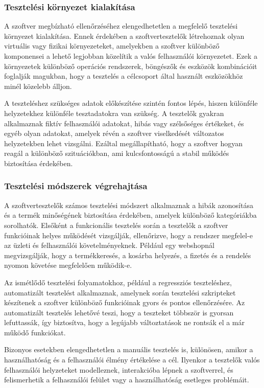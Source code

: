 \subsubsection{Tesztelési környezet kialakítása}
A szoftver megbízható ellenőrzéséhez elengedhetetlen a megfelelő tesztelési környezet kialakítása. Ennek érdekében a szoftvertesztelők létrehoznak olyan virtuális vagy fizikai környezeteket, amelyekben a szoftver különböző komponensei a lehető legjobban közelítik a valós felhasználói környezetet. Ezek a környezetek különböző operációs rendszerek, böngészők és eszközök kombinációit foglalják magukban, hogy a tesztelés a célcsoport által használt eszközökhöz minél közelebb álljon.  

A teszteléshez szükséges adatok előkészítése szintén fontos lépés, hiszen különféle helyzetekhez különféle tesztadatokra van szükség. A tesztelők gyakran alkalmaznak fiktív felhasználói adatokat, hibás vagy szélsőséges értékeket, és egyéb olyan adatokat, amelyek révén a szoftver viselkedését változatos helyzetekben lehet vizsgálni. Ezáltal megállapítható, hogy a szoftver hogyan reagál a különböző szituációkban, ami kulcsfontosságú a stabil működés biztosítása érdekében.

\subsubsection{Tesztelési módszerek végrehajtása}
A szoftvertesztelők számos tesztelési módszert alkalmaznak a hibák azonosítása és a termék minőségének biztosítása érdekében, amelyek különböző kategóriákba sorolhatók. Elsőként a funkcionális tesztelés során a tesztelők a szoftver funkcióinak helyes működését vizsgálják, ellenőrizve, hogy a rendszer megfelel-e az üzleti és felhasználói követelményeknek. Például egy webshopnál megvizsgálják, hogy a termékkeresés, a kosárba helyezés, a fizetés és a rendelés nyomon követése megfelelően működik-e.

Az ismétlődő tesztelési folyamatokhoz, például a regressziós teszteléshez, automatizált tesztelést alkalmaznak, amelynek során tesztelési szkripteket készítenek a szoftver különböző funkcióinak gyors és pontos ellenőrzésére. Az automatizált tesztelés lehetővé teszi, hogy a teszteket többször is gyorsan lefuttassák, így biztosítva, hogy a legújabb változtatások ne rontsák el a már működő funkciókat.

Bizonyos esetekben elengedhetetlen a manuális tesztelés is, különösen, amikor a használhatóság és a felhasználói élmény értékelése a cél. Ilyenkor a tesztelők valós felhasználói helyzeteket modelleznek, interakcióba lépnek a szoftverrel, és felismerhetik a felhasználói felület vagy a használhatóság esetleges problémáit.

